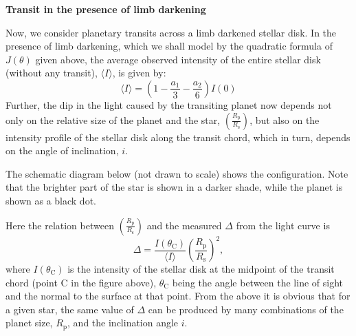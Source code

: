 \medskip\noindent\textbf{Transit in the presence of limb darkening}

Now, we consider planetary transits across a limb darkened stellar disk. In
the presence of limb darkening, which we shall model by the quadratic formula
of $J(\theta)$ given above, the average observed intensity of the entire
stellar disk (without any transit), $\langle I\rangle$, is given by:
\[
\langle I\rangle = \left(1 - \frac{a_1}{3} - \frac{a_2}{6}\right) I(0)
\]
Further, the dip in the light caused by the transiting planet now depends not
only on the relative size of the planet and the star,
$\left(\frac{R_{\mathrm{p}}}{R_{\mathrm{s}}}\right)$, but also on the
intensity profile of the stellar disk along the transit chord, which in turn,
depends on the angle of inclination, $i$.

The schematic diagram below (not drawn to scale) shows the configuration. Note
that the brighter part of the star is shown in a darker shade, while the
planet is shown as a black dot.


Here the relation between
$\left(\frac{R_{\mathrm{p}}}{R_{\mathrm{s}}}\right)$ and the measured $\Delta$
from the light curve is
\[
\Delta = \frac{I(\theta_{\mathrm{C}})}{\langle I\rangle}
  \left(\frac{R_{\mathrm{p}}}{R_{\mathrm{s}}}\right)^2,
\]
where $I(\theta_{\mathrm{C}})$ is the intensity of the stellar disk at the
midpoint of the transit chord (point C in the figure above),
$\theta_{\mathrm{C}}$ being the angle between the line of sight and the normal
to the surface at that point. From the above it is obvious that for a given
star, the same value of $\Delta$ can be produced by many combinations of the
planet size, $R_{\mathrm{p}}$, and the inclination angle $i$.

